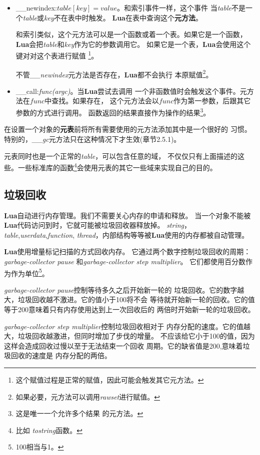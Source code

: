 \documentclass{ctexart}
\begin{document}
\begin{itemize}
\item \_\_newindex:$table[key]=value$。和索引事件一样，这个事件
当\emph{table}不是一个\emph{table}或\emph{key}不在表中时触发。
\textbf{Lua}在表中查询这个\textbf{元方法}。

和索引类似，这个元方法可以是一个函数或着一个表。如果它是一个函数，
\textbf{Lua}会把\emph{table}和\emph{key}作为它的参数调用它。
如果它是一个表，\textbf{Lua}会使用这个键对对这个表进行赋值
\footnote{这个赋值过程是正常的赋值，因此可能会触发其它元方法。}。

不管\emph{\_\_newindex}元方法是否存在，\textbf{Lua}都不会执行
本原赋值\footnote{如果必要，元方法可以调用\emph{rawset}进行赋值。}。

\item \_\_call:\emph{func(argc)}。当\textbf{Lua}尝试去调用
一个非函数值时会触发这个事件。元方法在$func$中查找。如果存在，
这个元方法会以$func$作为第一参数，后跟其它参数的方式进行调用。
函数返回的结果直接作为操作的结果\footnote{这是唯一一个允许多个结果
的元方法。}。

\end{itemize}

在设置一个对象的\textbf{元表}前将所有需要使用的元方法添加其中是一个很好的
习惯。特别的，\emph{\_\_gc}元方法只在这种情况下才生效(章节2.5.1)。

元表同时也是一个正常的\emph{table}，可以包含任意的域，
不仅仅只有上面描述的这些。一些标准库的函数\footnote{比如
\emph{tostring}函数。}会使用元表的其它一些域来实现自己的目的。

\subsection{垃圾回收}

\textbf{Lua}自动进行内存管理。我们不需要关心内存的申请和释放。
当一个对象不能被\textbf{Lua}代码访问到时，它就可能被垃圾回收器释放掉。
\emph{string}，\emph{table},\emph{userdata},\emph{function},
\emph{thread}，内部结构等等被\textbf{Lua}使用的内存都被自动管理。

\textbf{Lua}使用增量标记扫描的方式回收内存。
它通过两个数字控制垃圾回收的周期：\emph{garbage-collector pause}
和\emph{garbage-collector step multiplier}。
它们都使用百分数作为作为单位\footnote{100相当与1。}。

\emph{garbage-collector pause}控制等待多久之后开始新一轮的
垃圾回收。它的数字越大，垃圾回收越不激进。它的值小于100将不会
等待就开始新一轮的回收。它的值等于200意味着只有内存使用达到上一次回收后的
两倍时开始新一轮的垃圾回收。

\emph{garbage-collector step multiplier}控制垃圾回收相对于
内存分配的速度。它的值越大，垃圾回收越激进，但同时增加了步伐的增量。
不应该给它小于100的值，因为这样会造成回收过慢以至于无法结束一个回收
周期。它的缺省值是200,意味着垃圾回收的速度是
内存分配的两倍。
\end{document}
